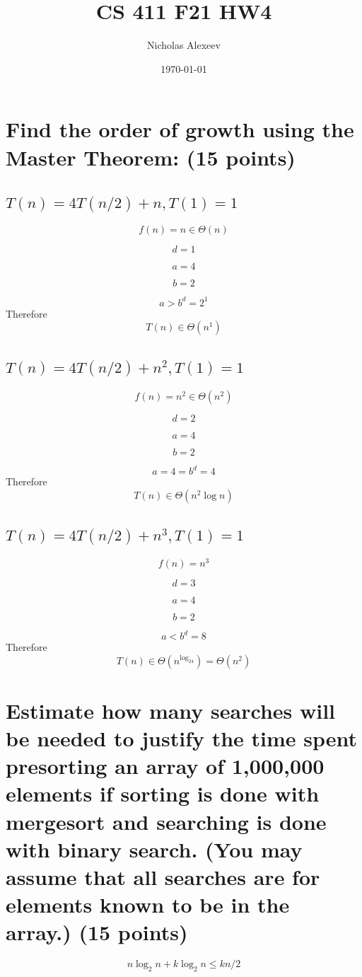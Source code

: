 \documentclass{article}
\title{CS 411 F21 HW4}
\author{Nicholas Alexeev }
\date{\today}
\begin{document}
\maketitle
\maketitle
\section{Find the order of growth using the Master Theorem:  (15 points)}
\subsection{$T(n) = 4T(n/2)+n, T(1)=1$}
$$
f(n) = n \in \Theta\left(n\right)
$$

$$
d=1
$$

$$
a=4
$$

$$
b=2
$$

$$
a > b^d = 2^1
$$
Therefore
$$
T(n)\in \Theta\left(n^1\right)
$$
\subsection{$T(n) = 4T(n/2)+n^2,T(1)=1$}
$$
f(n) = n^2 \in \Theta\left(n^2\right)
$$

$$
d=2
$$

$$
a=4
$$

$$
b=2
$$

$$
a=4=b^d=4
$$
Therefore
$$
T(n)\in\Theta\left(n^2\log n\right)
$$
\subsection{$T(n) = 4T(n/2)+n^3,T(1)=1$}
$$
f(n) = n^3
$$

$$
d=3
$$

$$
a=4
$$

$$
b=2
$$

$$
a<b^d=8
$$
Therefore
$$
T(n)\in \Theta \left(n^{\log_24}\right) = \Theta \left(n^2\right)
$$
\section{Estimate how many searches will be needed to justify the time spent presorting an array of 1,000,000 elements if sorting is done with mergesort and searching is done with binary search.  (You may assume that all searches are for elements known to be in the array.)  (15 points)}
$$
n\log_2n+k\log_2n\leq kn/2
$$
\end{document}
